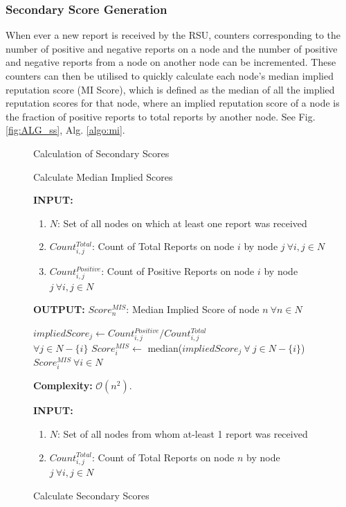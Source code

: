 \documentclass[journal]{IEEEtran}
\makeatletter
\newcommand{\removelatexerror}{\let\@latex@error\@gobble}
\makeatother
\begin{document}
\subsubsection{Secondary Score Generation}
When ever a new report is received by the RSU, counters corresponding to the number of positive and negative reports on a node and the number of positive and negative reports from a node on another node can be incremented. These counters can then be utilised to quickly calculate each node's median implied reputation score (MI Score), which is defined as the median of all the implied reputation scores for that node, where an implied reputation score of a node is the fraction of positive reports to total reports by another node. See Fig. \ref{fig:ALG_ss}, Alg. \ref{algo:mi}.
\begin{figure}[!t]\removelatexerror
	\caption{Calculation of Secondary Scores} 
	\label{fig:ALG_ss}
\begin{algorithm}[H]
	\caption{Calculate Median Implied Scores}  
	\label{algo:mi} 
	\textbf{INPUT:} 
	\begin{enumerate}
		\item $N$: Set of all nodes on which at least one report was received
		\item $Count^{Total}_{i,j}$: Count of Total Reports on node $ i $ by node $ j \ \forall i,j\in N $
		\item $Count^{Positive}_{i,j}$: Count of Positive Reports on node $ i $ by node $ j \ \forall i,j\in N $
	\end{enumerate}
	\textbf{OUTPUT:}  $Score^{MIS}_n$: Median Implied Score of node $n\ \forall n\in N$
	\begin{algorithmic}[1]
			\STATE $impliedScore_{j} \leftarrow Count^{Positive}_{i,j} / Count^{Total}_{i,j}$\\$\forall j \in N-\{i\} $
			\STATE $ Score^{MIS}_i \leftarrow$ median($impliedScore_j\ \forall\ j\in N-\{i\}$)
		\ENDFOR
		\RETURN $Score^{MIS}_i\ \forall i\in N$
	\end{algorithmic}
	\textbf{Complexity:} $\mathcal{O}(n^2)$.
\end{algorithm}
\begin{algorithm}[H]
	\caption{Calculate Secondary Scores}
	\label{algo:SSCalc}
	\textbf{INPUT:} 
	\begin{enumerate}
		\item $N$: Set of all nodes from whom at-least 1 report was received
		\item $Count^{Total}_{i,j}$: Count of Total Reports on node $ n $ by node $ j \ \forall i,j\in N $

\end{enumerate}
\end{algorithm}
\end{figure}
\end{document}

